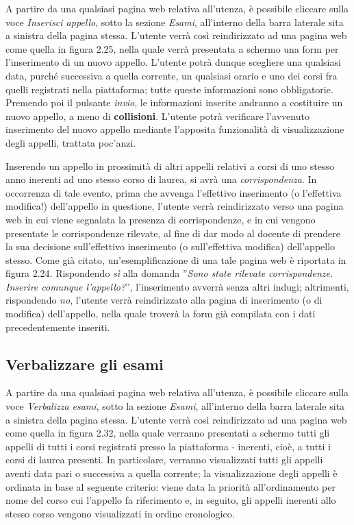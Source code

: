 \documentclass [a4paper,11pt]{book}
\begin{document}
A partire da una qualsiasi pagina web relativa all'utenza, è possibile cliccare sulla voce \emph{Inserisci appello}, sotto la sezione \emph{Esami}, all'interno della barra laterale sita a sinistra della pagina stessa. L'utente verrà così reindirizzato ad una pagina web come quella in figura 2.25, nella quale verrà presentata a schermo una form per l'inserimento di un nuovo appello. L'utente potrà dunque scegliere una qualsiasi data, purché successiva a quella corrente, un qualsiasi orario e uno dei corsi fra quelli registrati nella piattaforma; tutte queste informazioni sono obbligatorie. Premendo poi il pulsante \emph{invio}, le informazioni inserite andranno a costituire un nuovo appello, a meno di \textbf{collisioni}. L'utente potrà verificare l'avvenuto inserimento del nuovo appello mediante l'apposita funzionalità di visualizzazione degli appelli, trattata poc'anzi.

Inserendo un appello in prossimità di altri appelli relativi a corsi di uno stesso anno inerenti ad uno stesso corso di laurea, si avrà una \emph{corrispondenza}. In occorrenza di tale evento, prima che avvenga l'effettivo inserimento (o l'effettiva modifica!) dell'appello in questione, l'utente verrà reindirizzato verso una pagina web in cui viene segnalata la presenza di corrispondenze, e in cui vengono presentate le corrispondenze rilevate, al fine di dar modo al docente di prendere la sua decisione sull'effettivo inserimento (o sull'effettiva modifica) dell'appello stesso. Come già citato, un'esemplificazione di una tale pagina web è riportata in figura 2.24. Rispondendo \emph{sì} alla domanda ''\emph{Sono state rilevate corrispondenze. Inserire comunque l'appello?}'', l'inserimento avverrà senza altri indugi; altrimenti, rispondendo \emph{no}, l'utente verrà reindirizzato alla pagina di inserimento (o di modifica) dell'appello, nella quale troverà la form già compilata con i dati precedentemente inseriti.

\medskip

\subsection{Verbalizzare gli esami}

A partire da una qualsiasi pagina web relativa all'utenza, è possibile cliccare sulla voce \emph{Verbalizza esami}, sotto la sezione \emph{Esami}, all'interno della barra laterale sita a sinistra della pagina stessa. L'utente verrà così reindirizzato ad una pagina web come quella in figura 2.32, nella quale verranno presentati a schermo tutti gli appelli di tutti i corsi registrati presso la piattaforma - inerenti, cioè, a tutti i corsi di laurea presenti. In particolare, verranno visualizzati tutti gli appelli aventi data pari o successiva a quella corrente; la visualizzazione degli appelli è ordinata in base al seguente criterio: viene data la priorità all'ordinamento per nome del corso cui l'appello fa riferimento e, in seguito, gli appelli inerenti allo stesso corso vengono visualizzati in ordine cronologico.
\end{document}
